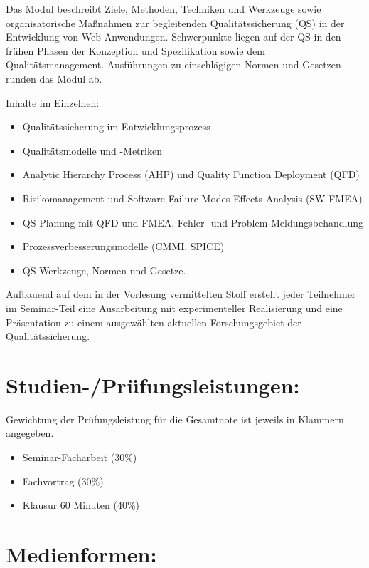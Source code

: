 Das Modul beschreibt Ziele, Methoden, Techniken und Werkzeuge sowie
organisatorische Maßnahmen zur begleitenden Qualitätssicherung (QS) in
der Entwicklung von Web-Anwendungen. Schwerpunkte liegen auf der QS in
den frühen Phasen der Konzeption und Spezifikation sowie dem
Qualitätsmanagement. Ausführungen zu einschlägigen Normen und Gesetzen
runden das Modul ab.

Inhalte im Einzelnen:

\begin{itemize}
\tightlist
\item
  Qualitätssicherung im Entwicklungsprozess
\item
  Qualitätsmodelle und -Metriken
\item
  Analytic Hierarchy Process (AHP) und Quality Function Deployment (QFD)
\item
  Risikomanagement und Software-Failure Modes Effects Analysis (SW-FMEA)
\item
  QS-Planung mit QFD und FMEA, Fehler- und Problem-Meldungsbehandlung
\item
  Prozessverbesserungsmodelle (CMMI, SPICE)
\item
  QS-Werkzeuge, Normen und Gesetze.
\end{itemize}

Aufbauend auf dem in der Vorlesung vermittelten Stoff erstellt jeder
Teilnehmer im Seminar-Teil eine Ausarbeitung mit experimenteller
Realisierung und eine Präsentation zu einem ausgewählten aktuellen
Forschungsgebiet der Qualitätssicherung.

\section*{Studien-/Prüfungsleistungen:\label{/mi-2017/modulbeschreibungen-master/MA_WTW_Modul_QUS_Winter}}\label{studien-pruxfcfungsleistungenpathlabelmi-2017modulbeschreibungen-mastermaux5fwtwux5fmodulux5fqusux5fwinter}

Gewichtung der Prüfungsleistung für die Gesamtnote ist jeweils in
Klammern angegeben.

\begin{itemize}
\tightlist
\item
  Seminar-Facharbeit (30\%)
\item
  Fachvortrag (30\%)
\item
  Klausur 60 Minuten (40\%)
\end{itemize}

\section*{Medienformen:\label{/mi-2017/modulbeschreibungen-master/MA_WTW_Modul_QUS_Winter}}\label{medienformenpathlabelmi-2017modulbeschreibungen-mastermaux5fwtwux5fmodulux5fqusux5fwinter}

